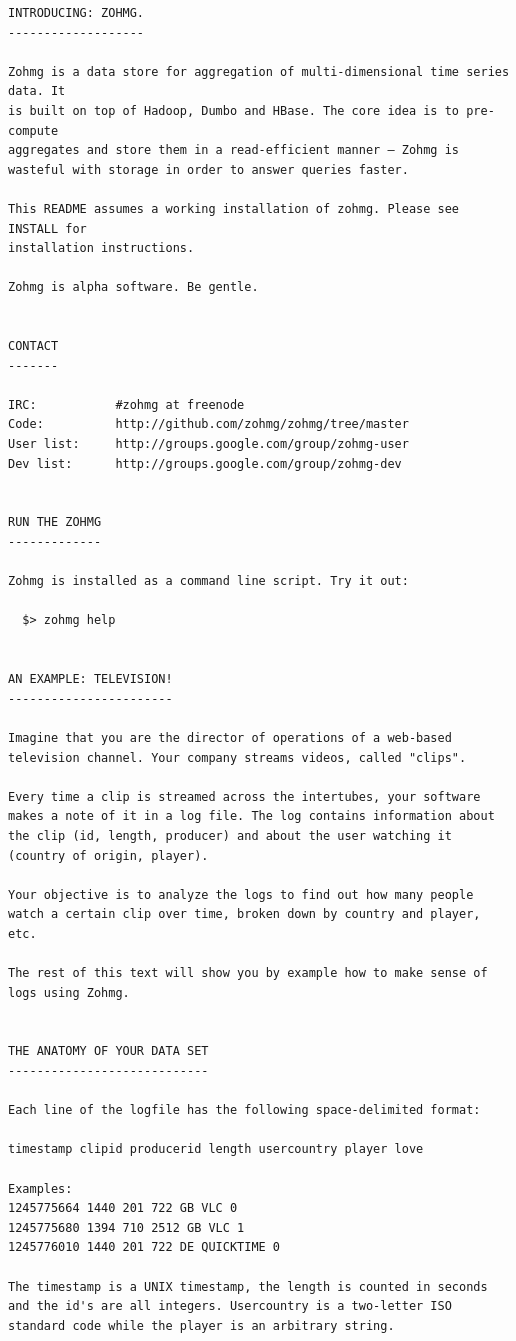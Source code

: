 \begin{verbatim}
INTRODUCING: ZOHMG.
-------------------

Zohmg is a data store for aggregation of multi-dimensional time series data. It
is built on top of Hadoop, Dumbo and HBase. The core idea is to pre-compute
aggregates and store them in a read-efficient manner – Zohmg is
wasteful with storage in order to answer queries faster.

This README assumes a working installation of zohmg. Please see INSTALL for
installation instructions.

Zohmg is alpha software. Be gentle.


CONTACT
-------

IRC:           #zohmg at freenode
Code:          http://github.com/zohmg/zohmg/tree/master
User list:     http://groups.google.com/group/zohmg-user
Dev list:      http://groups.google.com/group/zohmg-dev


RUN THE ZOHMG
-------------

Zohmg is installed as a command line script. Try it out:

  $> zohmg help


AN EXAMPLE: TELEVISION!
-----------------------

Imagine that you are the director of operations of a web-based
television channel. Your company streams videos, called "clips".

Every time a clip is streamed across the intertubes, your software
makes a note of it in a log file. The log contains information about
the clip (id, length, producer) and about the user watching it
(country of origin, player).

Your objective is to analyze the logs to find out how many people
watch a certain clip over time, broken down by country and player,
etc.

The rest of this text will show you by example how to make sense of
logs using Zohmg.


THE ANATOMY OF YOUR DATA SET
----------------------------

Each line of the logfile has the following space-delimited format:
 
timestamp clipid producerid length usercountry player love

Examples:
1245775664 1440 201 722 GB VLC 0
1245775680 1394 710 2512 GB VLC 1
1245776010 1440 201 722 DE QUICKTIME 0

The timestamp is a UNIX timestamp, the length is counted in seconds
and the id's are all integers. Usercountry is a two-letter ISO
standard code while the player is an arbitrary string.


\end{verbatim}
